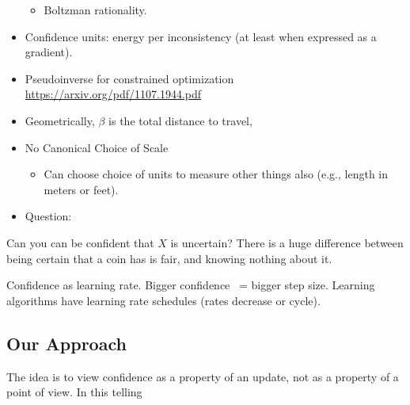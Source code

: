 \documentclass{article}
\begin{document}
\begin{itemize}
\begin{itemize}
    \item Boltzman rationality.
\end{itemize}


\item Confidence units: energy per inconsistency (at least when expressed as a gradient).

\item Pseudoinverse for constrained optimization
    \url{https://arxiv.org/pdf/1107.1944.pdf}

\item Geometrically, $\beta$ is the total distance to travel, 

\item No Canonical Choice of Scale

\begin{itemize}
    \item Can choose choice of units to measure other things also (e.g., length in meters or feet).  
\end{itemize}

\item Question: 


\end{itemize}






Can you can be confident that $X$ is uncertain?
There is a huge difference between being certain that a coin has is fair, and knowing nothing about it.







Confidence as learning rate. Bigger confidence ~= bigger step size.
Learning algorithms have learning rate schedules (rates decrease or cycle).

\subsection*{Our Approach}
The idea is to view confidence as a property of an update, not as a property of a point of view.
In this telling
\end{document}
